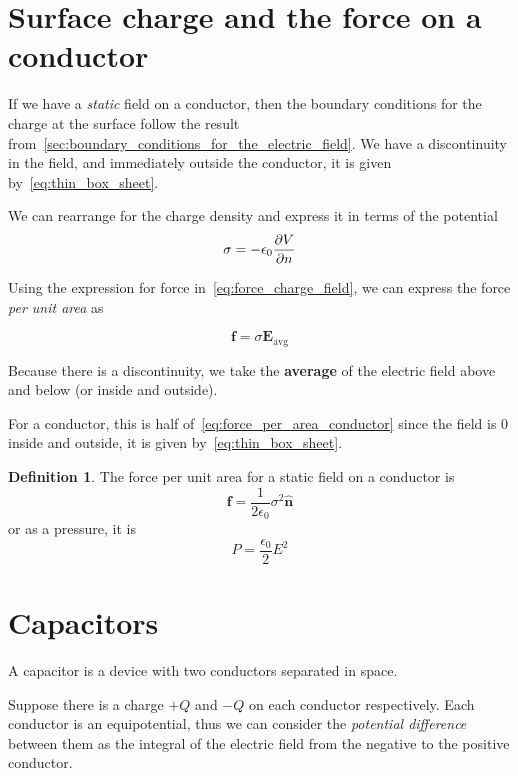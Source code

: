 \documentclass[12pt,chapterprefix=false,dvipsnames]{scrbook}
\theoremstyle{dotless}
\theoremstyle{definition}
\newtheorem{protodefinition}{Definition}[section]
\newenvironment{definition}
{\colorlet{shadecolor}{black!15}\begin{shaded}\begin{protodefinition}}
			{\end{protodefinition}\end{shaded}}
\begin{document}
\section{Surface charge and the force on a conductor}%
\label{sec:surface_charge_and_the_force_on_a_conductor}%

If we have a \textit{static} field on a conductor, then
the boundary conditions for the charge at the surface follow the
result from~\ref{sec:boundary_conditions_for_the_electric_field}. We have a discontinuity in
the field, and immediately outside the conductor, it is given
by~\ref{eq:thin_box_sheet}.

We can rearrange for the charge density and express it in terms
of the potential
\begin{equation}
	\sigma = -\epsilon_{0} \pdv{V}{n}
\end{equation}

Using the expression for force in~\ref{eq:force_charge_field}, we
can express the force \textit{per unit area} as

\begin{equation}
	\label{eq:force_per_area_conductor}
	\bm{f} = \sigma \bm{E_{\mathrm{avg}}}
\end{equation}

Because there is a discontinuity, we take the
\textbf{average} of the electric field above and below
(or inside and outside).

For a conductor, this is half of~\ref{eq:force_per_area_conductor} since
the field is 0 inside and outside, it is given
by~\ref{eq:thin_box_sheet}.

\begin{definition}
	The force per unit area for a static field on a conductor is
	\begin{equation}
		\bm{f} = \frac{1}{2\epsilon_{0}}\sigma^2
		\hat{ \bm{n} }
	\end{equation}
	or as a pressure, it is
	\begin{equation}
		P = \frac{\epsilon_{0}}{2}E^2
	\end{equation}
\end{definition}

\section{Capacitors}%
\label{sec:capacitors}

A capacitor is a device with two conductors separated in space.

Suppose there is a charge $+Q$ and
$-Q$ on each conductor respectively. Each
conductor is an equipotential, thus we can consider the
\textit{potential difference} between them as the integral of the
electric field from the negative to the positive conductor.
\end{document}
